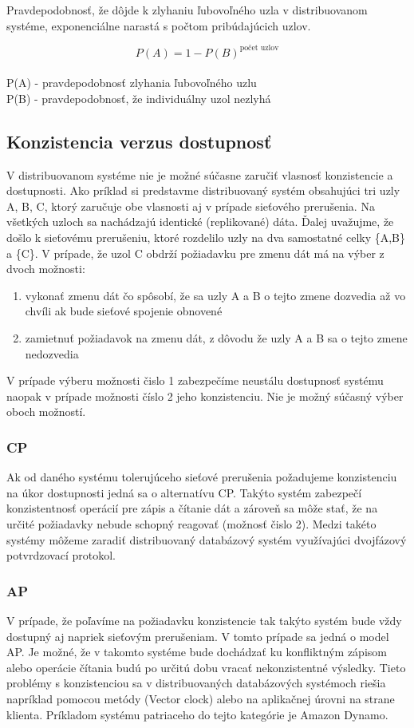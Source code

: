 \documentclass[11pt,twoside,a4paper]{book}
\begin{document}
\noindent
Pravdepodobnosť, že dôjde k zlyhaniu ľubovoľného uzla v distribuovanom systéme, exponenciálne narastá s počtom pribúdajúcich uzlov.

$$P(A) = 1 - P(B)^{\textrm{počet uzlov}}$$
\\
P(A) - pravdepodobnosť zlyhania ľubovoľného uzlu \\
P(B) - pravdepodobnosť, že individuálny uzol nezlyhá

\subsection{Konzistencia verzus dostupnosť}

V distribuovanom systéme nie je možné súčasne zaručiť vlasnosť konzistencie a dostupnosti. Ako príklad si predstavme distribuovaný systém obsahujúci tri uzly A, B, C, ktorý zaručuje obe vlasnosti aj v prípade sieťového prerušenia. Na všetkých uzloch sa nachádzajú identické (replikované) dáta. Ďalej uvažujme, že došlo k sieťovému prerušeniu, ktoré rozdelilo uzly na dva samostatné celky \{A,B\} a \{C\}. V prípade, že uzol C obdrží požiadavku pre zmenu dát má na výber z dvoch možnosti:
\begin{enumerate}
 \item vykonať zmenu dát čo spôsobí, že sa uzly A a B o tejto zmene dozvedia až vo chvíli ak bude sieťové spojenie obnovené
 \item zamietnuť požiadavok na zmenu dát, z dôvodu že uzly A a B sa o tejto zmene nedozvedia
\end{enumerate}

V prípade výberu možnosti čislo 1 zabezpečíme neustálu dostupnosť systému naopak v prípade možnosti číslo 2 jeho konzistenciu. Nie je možný súčasný výber oboch možností.

\subsubsection*{CP}
Ak od daného systému tolerujúceho sieťové prerušenia požadujeme konzistenciu na úkor dostupnosti jedná sa o alternatívu CP. Takýto systém zabezpečí konzistentnosť operácií pre zápis a čítanie dát a zároveň sa môže stať, že na určité požiadavky nebude schopný reagovať (možnosť čislo 2). Medzi takéto systémy môžeme zaradiť distribuovaný databázový systém využívajúci dvojfázový potvrdzovací protokol.

\subsubsection*{AP}
V prípade, že poľavíme na požiadavku konzistencie tak takýto systém bude vždy dostupný aj napriek sieťovým prerušeniam. V tomto prípade sa jedná o model AP. Je možné, že v takomto systéme bude dochádzať ku konfliktným zápisom alebo operácie čítania budú po určitú dobu vracať nekonzistentné výsledky. Tieto problémy s konzistenciou sa v distribuovaných databázových systémoch riešia napríklad pomocou metódy  (Vector clock) \cite{TODO} alebo na aplikačnej úrovni na strane klienta. Príkladom systému patriaceho do tejto kategórie je Amazon Dynamo.
\end{document}
